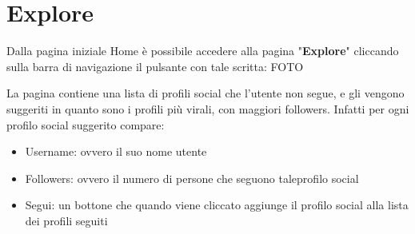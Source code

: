 \section{Explore} {
    Dalla pagina iniziale Home è possibile accedere alla pagina "\textbf{Explore}" cliccando sulla barra di navigazione il pulsante con tale scritta:
    FOTO

    La pagina contiene una lista di profili social che l'utente non segue, e gli vengono suggeriti in quanto sono i profili più virali, con maggiori followers.
    Infatti per ogni profilo social suggerito compare:
    \begin{itemize}
        \item Username: ovvero il suo nome utente
        \item Followers: ovvero il numero di persone che seguono taleprofilo social
        \item Segui: un bottone che quando viene cliccato aggiunge il profilo social alla lista dei profili seguiti
    \end{itemize}
}
